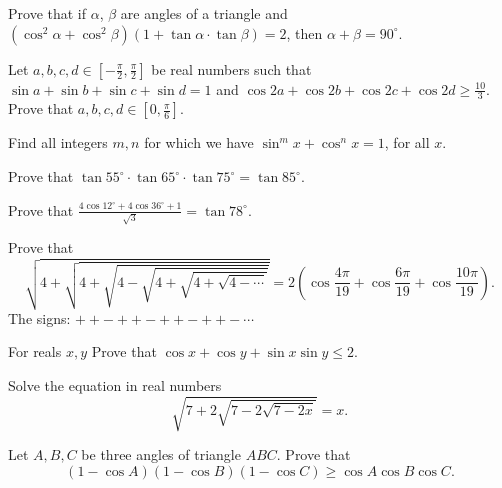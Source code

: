 \begin{question} Prove that if $ \alpha$, $ \beta$ are angles of a triangle and $ \left(\cos^2\alpha+ \cos^2\beta\right)\left(1+ \tan\alpha \cdot \tan\beta\right)= 2$, then $ \alpha + \beta= 90^{\circ}.$
\end{question}



\begin{question} Let $a,b,c,d \in [-\frac{\pi}{2}, \frac{\pi}{2}]$ be real numbers such that
$\sin{a}+\sin{b}+\sin{c}+\sin{d}=1$ and $\cos{2a}+\cos{2b}+\cos{2c}+\cos{2d}\geq \frac{10}{3}$.
Prove that $a,b,c,d \in [0, \frac{\pi}{6}]$.
\end{question}


\begin{question} Find all integers $m,n$ for which we have $\sin^{m}x+\cos^{n}x=1$, for all $x.$
\end{question}


\begin{question} Prove that $\tan 55^{\circ} \cdot \tan 65^{\circ} \cdot \tan 75^{\circ}=\tan 85^{\circ}.$
\end{question}


\begin{question} Prove that $\frac{4 \cos12^{\circ}+4 \cos 36^{\circ}+1}{\sqrt{3}}=\tan 78^{\circ}.$
\end{question}


\begin{question} Prove that
\[ \sqrt{4+\sqrt{4+\sqrt{4-\sqrt{4+\sqrt{4+\sqrt{4-\cdots}}}}}}=2\left(\cos\frac{4\pi}{19}+\cos\frac{6\pi}{19}+\cos\frac{10\pi}{19}\right).\]
The signs: $ ++-++-++-++-\cdots$
\end{question}



\begin{question} For reals $x,y$ Prove that $\cos{x}+\cos{y}+\sin{x}\sin{y}\leq 2.$
\end{question}



\begin{question} Solve the equation in real numbers
\[\sqrt{7+2\sqrt{7-2\sqrt{7-2x}}}=x.\]
\end{question}



\begin{question} Let $A,B,C$ be three angles of triangle $ABC$. Prove that
\[(1-\cos A)(1-\cos B)(1-\cos C)\geq \cos A\cos B\cos C.\]
\end{question}



